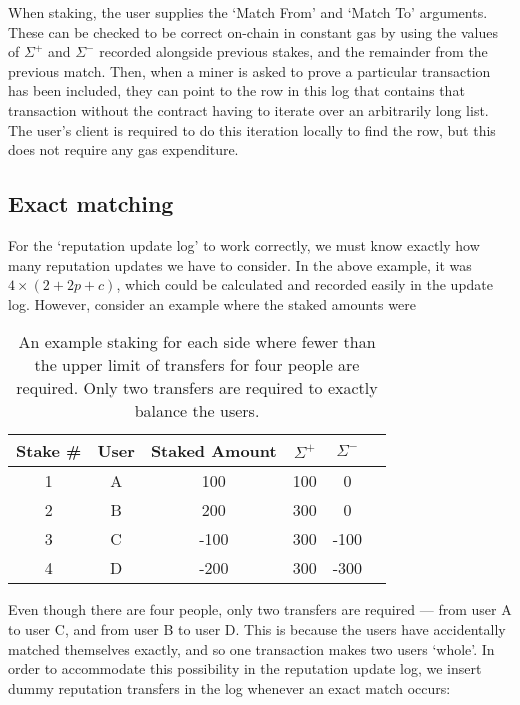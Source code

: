 When staking, the user supplies the `Match From' and `Match To' arguments. These can be checked to be correct on-chain in constant gas by using the values of $\Sigma^+$ and $\Sigma^-$ recorded alongside previous stakes, and the remainder from the previous match. Then, when a miner is asked to prove a particular transaction has been included, they can point to the row in this log that contains that transaction without the contract having to iterate over an arbitrarily long list. The user's client is required to do this iteration locally to find the row, but this does not require any gas expenditure.

\subsection{Exact matching}\label{sec:exactMatching}

For the `reputation update log' to work correctly, we must know exactly how many reputation updates we have to consider. In the above example, it was $4\times (2+2p+c)$, which could be calculated and recorded easily in the update log. However, consider an example where the staked amounts were

\begin{table}[ht]
\centering
\caption{An example staking for each side where fewer than the upper limit of transfers for four people are required. Only two transfers are required to exactly balance the users.}
\begin{tabular}{|c|c|c|c|c|c|}
\hline
Stake \# & User  & Staked Amount & $\Sigma^+$ & $\Sigma^-$ \\ \hline
1 & A & 100           & 100                      & 0                                                                       \\ \hline
2 & B & 200           & 300                      & 0                                                                       \\ \hline
3 & C & -100           & 300                      & -100                                                                       \\ \hline
4 & D & -200          & 300                      & -300                                                                    \\ \hline
\end{tabular}
\end{table}

Even though there are four people, only two transfers are required --- from user A to user C, and from user B to user D. This is because the users have accidentally matched themselves exactly, and so one transaction makes two users `whole'. In order to accommodate this possibility in the reputation update log, we insert dummy reputation transfers in the log whenever an exact match occurs:

